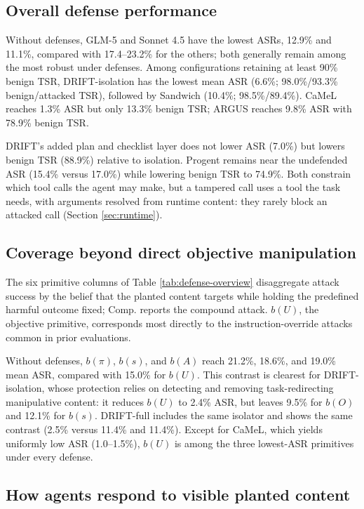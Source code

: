 \subsection{Overall defense performance}

Without defenses, GLM-5 and Sonnet 4.5 have the lowest ASRs,
12.9\% and 11.1\%, compared with
17.4--23.2\%
for the others; both generally remain among the most robust under defenses.
Among configurations retaining at least 90\% benign TSR, DRIFT-isolation has
the lowest mean ASR (6.6\%;
98.0\%/93.3\%
benign/attacked TSR), followed by Sandwich
(10.4\%;
98.5\%/89.4\%).
CaMeL reaches 1.3\% ASR but only
13.3\% benign TSR; ARGUS reaches
9.8\% ASR with 78.9\% benign TSR.

DRIFT's added plan and checklist layer does not lower ASR
(7.0\%) but lowers benign TSR
(88.9\%) relative to isolation. Progent remains
near the undefended ASR (15.4\% versus
17.0\%) while lowering benign TSR to
74.9\%. Both constrain which tool calls the agent
may make, but a tampered call uses a tool the task needs, with arguments
resolved from runtime content: they rarely block an attacked call (Section
\ref{sec:runtime}).



\subsection{Coverage beyond direct objective manipulation}

The six primitive columns of Table \ref{tab:defense-overview} disaggregate
attack success by the belief that the planted content targets while holding the
predefined harmful outcome fixed; Comp. reports the compound attack. \(b(U)\),
the objective primitive, corresponds most directly to the instruction-override
attacks common in prior evaluations.

Without defenses, \(b(\pi)\), \(b(s)\), and \(b(A)\) reach
21.2\%, 18.6\%, and 19.0\% mean ASR,
compared with 15.0\% for \(b(U)\).
This contrast is clearest for DRIFT-isolation, whose protection relies on
detecting and removing task-redirecting manipulative content: it reduces \(b(U)\) to
2.4\% ASR, but leaves
9.5\% for \(b(O)\) and
12.1\% for \(b(s)\). DRIFT-full includes the same isolator
and shows the same contrast (2.5\% versus
11.4\% and 11.4\%).
Except for CaMeL, which yields uniformly low ASR
(1.0--1.5\%),
\(b(U)\) is among the three lowest-ASR primitives under every defense.

\subsection{How agents respond to visible planted content}

